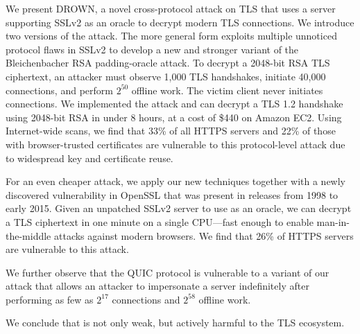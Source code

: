 We present DROWN, a novel cross-protocol attack on TLS that uses a server
supporting SSLv2 as an oracle to decrypt modern TLS connections. We introduce
two versions of the attack. The more general form exploits multiple unnoticed
protocol flaws in SSLv2 to develop a new and stronger variant of the
Bleichenbacher RSA padding-oracle attack. To decrypt a 2048-bit RSA TLS
ciphertext, an attacker must observe 1,000 TLS handshakes, initiate 40,000
\ssltwo connections, and perform $2^{50}$ offline work. The victim client
never initiates \ssltwo connections. We implemented the attack and can
decrypt a TLS 1.2 handshake using 2048-bit RSA in under 8 hours, at a cost of
\$440 on Amazon EC2\@. Using Internet-wide scans, we find that 33\% of all
HTTPS servers and 22\% of those with browser-trusted certificates are
vulnerable to this protocol-level attack due to widespread key and
certificate reuse.

For an even cheaper attack, we apply our new techniques together with a newly
discovered vulnerability in OpenSSL that was present in releases from 1998 to
early 2015. Given an unpatched SSLv2 server to use as an oracle, we can
decrypt a TLS ciphertext in one minute on a single CPU---fast enough to
enable man-in-the-middle attacks against modern browsers. We find that 26\%
of HTTPS servers are vulnerable to this attack.

We further observe that the QUIC protocol is vulnerable to a variant of our
attack that allows an attacker to impersonate a server indefinitely after
performing as few as $2^{17}$ \ssltwo connections and $2^{58}$ offline work.

We conclude that \ssltwo is not only weak, but actively harmful to the TLS ecosystem.

